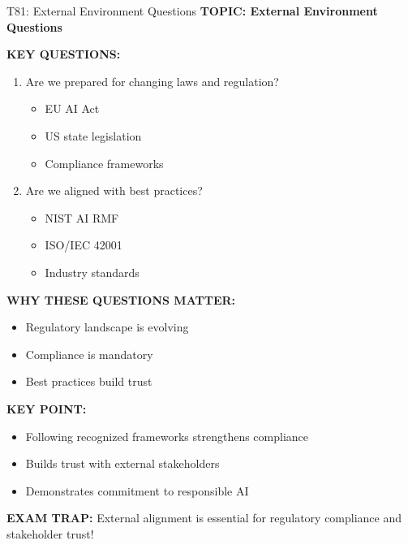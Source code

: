 \documentclass[8pt]{beamer}
\begin{document}
	\begin{frame}{T81: External Environment Questions}
		\fontsize{6.5}{7.5}\selectfont
		\textbf{TOPIC: External Environment Questions}
		
		\vspace{0.1cm}
		\textbf{KEY QUESTIONS:}
		\begin{enumerate}
			\item \textcolor{myblue}{Are we prepared for changing laws and regulation?}
			\begin{itemize}
				\item EU AI Act
				\item US state legislation
				\item Compliance frameworks
			\end{itemize}
			\item \textcolor{myblue}{Are we aligned with best practices?}
			\begin{itemize}
				\item NIST AI RMF
				\item ISO/IEC 42001
				\item Industry standards
			\end{itemize}
		\end{enumerate}
		
		\vspace{0.1cm}
		\textbf{WHY THESE QUESTIONS MATTER:}
		\begin{itemize}
			\item Regulatory landscape is evolving
			\item Compliance is mandatory
			\item Best practices build trust
		\end{itemize}
		
		\vspace{0.1cm}
		\textbf{KEY POINT:}
		\begin{itemize}
			\item Following recognized frameworks strengthens compliance
			\item Builds trust with external stakeholders
			\item Demonstrates commitment to responsible AI
		\end{itemize}
		
		\textcolor{myred}{\textbf{EXAM TRAP:}} External alignment is \textcolor{myblue}{essential for regulatory compliance and stakeholder trust}!
	\end{frame}
	
\end{document}

